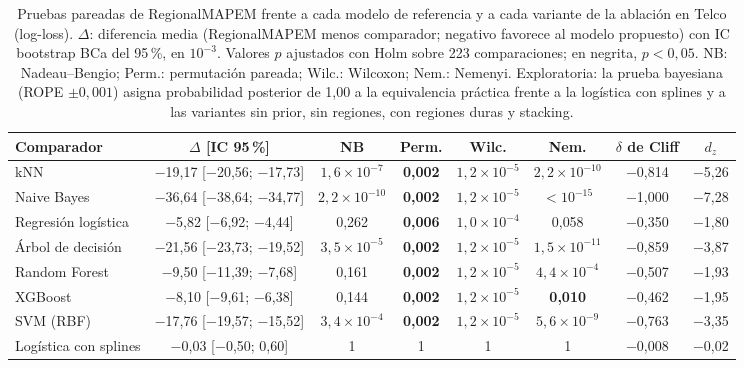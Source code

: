 \documentclass[11pt,a4paper]{article}
\begin{document}
\begin{table}[t]
\centering
\caption{Pruebas pareadas de RegionalMAPEM frente a cada modelo de referencia y a cada variante de la ablación en Telco (log-loss). $\Delta$: diferencia media (RegionalMAPEM menos comparador; negativo favorece al modelo propuesto) con IC bootstrap BCa del 95\,\%, en $10^{-3}$. Valores $p$ ajustados con Holm sobre 223 comparaciones; en negrita, $p<0{,}05$. NB: Nadeau--Bengio; Perm.: permutación pareada; Wilc.: Wilcoxon; Nem.: Nemenyi. Exploratoria: la prueba bayesiana (ROPE $\pm0{,}001$) asigna probabilidad posterior de 1,00 a la equivalencia práctica frente a la logística con splines y a las variantes sin prior, sin regiones, con regiones duras y stacking.}
\label{tab:pruebas}
\footnotesize
\setlength{\tabcolsep}{2.5pt}
\begin{tabular}{lccccccc}
\toprule
Comparador & $\Delta$ [IC 95\,\%] & NB & Perm. & Wilc. & Nem. & $\delta$ de Cliff & $d_z$ \\
\midrule
kNN & $-$19{,}17 [$-$20{,}56; $-$17{,}73] & \textbf{$1{,}6\times10^{-7}$} & \textbf{0{,}002} & \textbf{$1{,}2\times10^{-5}$} & \textbf{$2{,}2\times10^{-10}$} & $-$0{,}814 & $-$5{,}26 \\
Naive Bayes & $-$36{,}64 [$-$38{,}64; $-$34{,}77] & \textbf{$2{,}2\times10^{-10}$} & \textbf{0{,}002} & \textbf{$1{,}2\times10^{-5}$} & \textbf{$<10^{-15}$} & $-$1{,}000 & $-$7{,}28 \\
Regresión logística & $-$5{,}82 [$-$6{,}92; $-$4{,}44] & 0{,}262 & \textbf{0{,}006} & \textbf{$1{,}0\times10^{-4}$} & 0{,}058 & $-$0{,}350 & $-$1{,}80 \\
Árbol de decisión & $-$21{,}56 [$-$23{,}73; $-$19{,}52] & \textbf{$3{,}5\times10^{-5}$} & \textbf{0{,}002} & \textbf{$1{,}2\times10^{-5}$} & \textbf{$1{,}5\times10^{-11}$} & $-$0{,}859 & $-$3{,}87 \\
Random Forest & $-$9{,}50 [$-$11{,}39; $-$7{,}68] & 0{,}161 & \textbf{0{,}002} & \textbf{$1{,}2\times10^{-5}$} & \textbf{$4{,}4\times10^{-4}$} & $-$0{,}507 & $-$1{,}93 \\
XGBoost & $-$8{,}10 [$-$9{,}61; $-$6{,}38] & 0{,}144 & \textbf{0{,}002} & \textbf{$1{,}2\times10^{-5}$} & \textbf{0{,}010} & $-$0{,}462 & $-$1{,}95 \\
SVM (RBF) & $-$17{,}76 [$-$19{,}57; $-$15{,}52] & \textbf{$3{,}4\times10^{-4}$} & \textbf{0{,}002} & \textbf{$1{,}2\times10^{-5}$} & \textbf{$5{,}6\times10^{-9}$} & $-$0{,}763 & $-$3{,}35 \\
Logística con splines & $-$0{,}03 [$-$0{,}50; 0{,}60] & 1 & 1 & 1 & 1 & $-$0{,}008 & $-$0{,}02 \\

\end{tabular}
\end{table}
\end{document}
